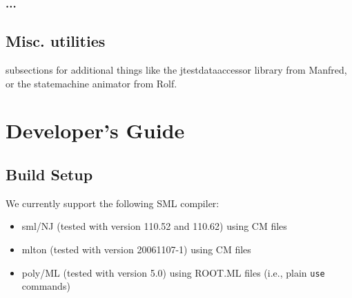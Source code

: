 \documentclass[bibtotoc,liststotoc]{scrbook}
\begin{document}
\subsection{...}
 
\section{Misc. utilities}

 subsections for additional things like the jtestdataaccessor
  library from Manfred, or the statemachine animator from Rolf.

\chapter{Developer's Guide}
\section{Build Setup}
We currently support the following SML compiler:
\begin{itemize}
\item sml/NJ (tested with version 110.52 and 110.62) using CM files
\item mlton  (tested with version 20061107-1) using CM files
\item poly/ML (tested with version 5.0) using ROOT.ML files (i.e., plain \texttt{use} commands)
\end{itemize}




\end{document}
